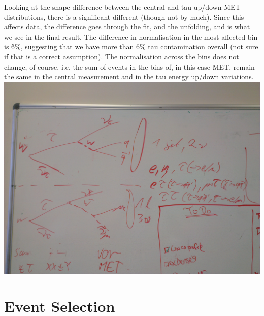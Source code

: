 Looking at the shape difference between the central and tau up/down MET distributions, there is a significant
different (though not by much). Since this affects data, the difference goes through the fit, and the
unfolding, and is what we see in the final result. The difference in normalisation in the most affected bin is
\~6\%, suggesting that we have more than 6\% tau contamination overall (not sure if that is a correct
assumption). The normalisation across the bins does not change, of course, i.e. the sum of events in the bins
of, in this case MET, remain the same in the central measurement and in the tau energy up/down variations.
\includegraphics[width=\textwidth]{Chapters/04_Analysis/04b_XSections/Images/IMG_20150219_160840.jpg}

\section{Event Selection}
\label{s:event_selection}
